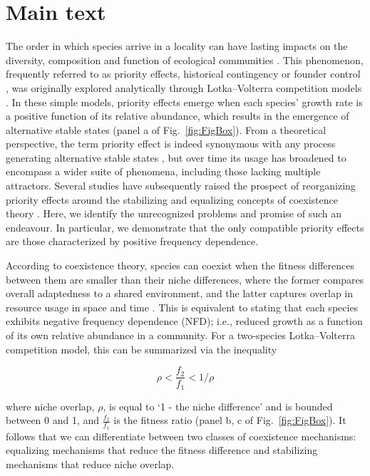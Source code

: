\section{Main text}
The order in which species arrive in a locality can have lasting impacts on the diversity, composition and function of ecological communities \citep{Chase2003Oecologia, Fukami2015}. This phenomenon, frequently referred to as priority effects, historical contingency or founder control \citep{Slatkin1974}, was originally explored analytically through Lotka--Volterra competition models \citep{Lewontin1969, May1971}. In these simple models, priority effects emerge when each species' growth rate is a positive function of its relative abundance, which results in the emergence of alternative stable states (panel a of Fig.~\ref{fig:FigBox}). From a theoretical perspective, the term priority effect is indeed synonymous with any process generating alternative stable states \citep{Petraitis2013}, but over time its usage has broadened to encompass a wider suite of phenomena, including those lacking multiple attractors. Several studies have subsequently raised the prospect of reorganizing priority effects around the stabilizing and equalizing concepts of coexistence theory \citep{Mordecai2011, Fukami2016, Letten2017}. Here, we identify the unrecognized problems and promise of such an endeavour. In particular, we demonstrate that the only compatible priority effects are those characterized by positive frequency dependence. 
\par 


According to coexistence theory, species can coexist when the fitness differences between them are smaller than their niche differences, where the former compares overall adaptedness to a shared environment, and the latter captures overlap in resource usage in space and time \citep{Chesson2000}. This is equivalent to stating that each species exhibits negative frequency dependence (NFD); i.e., reduced growth as a function of its own relative abundance in a community. For a two-species Lotka--Volterra competition model, this can be summarized via the inequality 

\begin{equation}
\rho < \frac{f_{2}}{f_{1}} < 1/\rho
\tag{3.1}\label{eq:3.1}
\end{equation}

\noindent where niche overlap, $\rho$, is equal to `1 - the niche difference' and is bounded between 0 and 1, and $\frac{f_{2}}{f_{1}}$ is the fitness ratio (panel b, c of Fig.~\ref{fig:FigBox}). It follows that we can differentiate between two classes of coexistence mechanisms: equalizing mechanisms that reduce the fitness difference and stabilizing mechanisms that reduce niche overlap. 
\par



